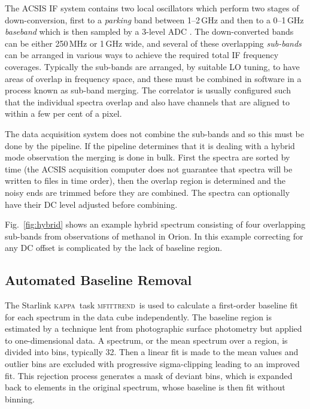 \documentclass[useAMS,usenatbib]{mn2e}
\newcommand{\KAPPA}{\textsc{kappa}}
\newcommand{\mfittrend}{\textsc{mfittrend}}
\begin{document}
The ACSIS IF system contains two local oscillators which perform two
stages of down-conversion, first to a \emph{parking} band between
1--2\,GHz and then to a 0--1\,GHz \emph{baseband} which is then sampled
by a 3-level ADC \citep{2000SPIE.4015..114H}. The down-converted bands
can be either 250\,MHz or 1\,GHz wide, and several of these
overlapping \emph{sub-bands} can be arranged in various ways to
achieve the required total IF frequency coverages. Typically the
sub-bands are arranged, by suitable LO tuning, to have areas of
overlap in frequency space, and these must be combined in software in
a process known as sub-band merging. The correlator is usually
configured such that the individual spectra overlap and also have
channels that are aligned to within a few per cent of a pixel.

The data acquisition system does not combine the sub-bands and so this
must be done by the pipeline. If the pipeline determines that it is
dealing with a hybrid mode observation the merging is done in
bulk. First the spectra are sorted by time (the ACSIS acquisition
computer does not guarantee that spectra will be written to files in
time order), then the overlap region is determined and the noisy ends
are trimmed before they are combined. The spectra can optionally have
their DC level adjusted before combining.

Fig.\ \ref{fig:hybrid} shows an example hybrid spectrum consisting of
four overlapping sub-bands from observations of methanol in Orion. In this
example correcting for any DC offset is complicated by the lack of
baseline region.

\subsection{Automated Baseline Removal}
\label{sec:mfittrend}

The Starlink \KAPPA\ task \mfittrend\ is used to calculate a
first-order baseline fit for each spectrum in the data cube
independently. The baseline region is estimated by a technique lent
from photographic surface photometry \citep{1998A&AS..127..367Y} but applied to one-dimensional
data.  A spectrum, or the mean spectrum over a region, is divided into
bins, typically 32.  Then a linear fit is made to the mean values and
outlier bins are excluded with progressive sigma-clipping leading to
an improved fit.  This rejection process generates a mask of deviant
bins, which is expanded back to elements in the original spectrum,
whose baseline is then fit without binning.
\end{document}
